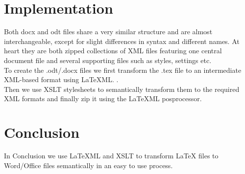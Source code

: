 \documentclass[draft]{llncs}
\begin{document}
\section{Implementation}\label{sec:impl}
Both docx and odt files share a very similar structure and are almost interchangeable, except for slight differences in syntax and different names. At heart they are both zipped collections of XML files featuring one central document file and several supporting files such as styles, settings etc. \\
To create the .odt/.docx files we first transform the .tex file to an intermediate XML-based format using {\LaTeX}ML. . \\ 
Then we use XSLT stylesheets to semantically transform them to the required XML formats and finally zip it using the {\LaTeX}ML posprocessor. \\ 

\section{Conclusion}\label{sec:concl}
In Conclusion we use {\LaTeX}ML and XSLT to transform {\LaTeX} files to Word/Office files semantically in an easy to use process. 
\printbibliography
\end{document}
